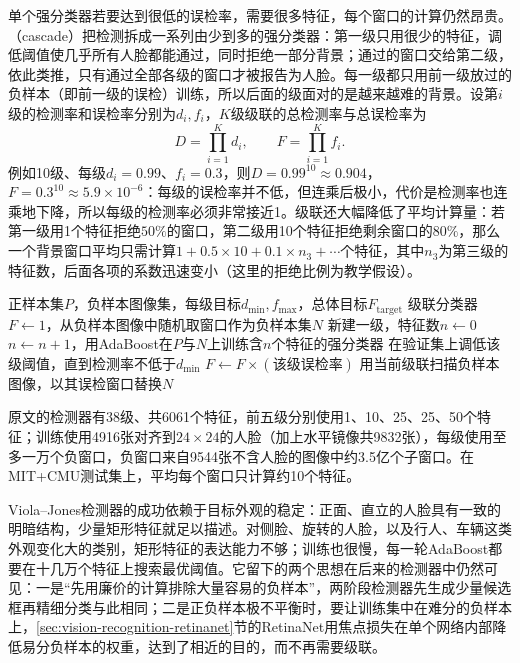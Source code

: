 单个强分类器若要达到很低的误检率，需要很多特征，每个窗口的计算仍然昂贵。（cascade）把检测拆成一系列由少到多的强分类器：第一级只用很少的特征，调低阈值使几乎所有人脸都能通过，同时拒绝一部分背景；通过的窗口交给第二级，依此类推，只有通过全部各级的窗口才被报告为人脸。每一级都只用前一级放过的负样本（即前一级的误检）训练，所以后面的级面对的是越来越难的背景。设第$i$级的检测率和误检率分别为$d_i,f_i$，$K$级级联的总检测率与总误检率为
\[
  D=\prod_{i=1}^{K}d_i,\qquad F=\prod_{i=1}^{K}f_i.
\]
例如10级、每级$d_i=0.99$、$f_i=0.3$，则$D=0.99^{10}\approx0.904$，$F=0.3^{10}\approx5.9\times10^{-6}$：每级的误检率并不低，但连乘后极小，代价是检测率也连乘地下降，所以每级的检测率必须非常接近1。级联还大幅降低了平均计算量：若第一级用1个特征拒绝$50\%$的窗口，第二级用10个特征拒绝剩余窗口的$80\%$，那么一个背景窗口平均只需计算$1+0.5\times10+0.1\times n_3+\cdots$个特征，其中$n_3$为第三级的特征数，后面各项的系数迅速变小（这里的拒绝比例为教学假设）。

\begin{algorithm}[级联检测器的训练]
  \label{alg:vision-features-cascade}
  \begin{algorithmic}[1]
    \Require 正样本集$P$，负样本图像集，每级目标$d_{\min},f_{\max}$，总体目标$F_{\mathrm{target}}$
    \Ensure 级联分类器
    \State $F\gets1$，从负样本图像中随机取窗口作为负样本集$N$
      \State 新建一级，特征数$n\gets0$
      \Repeat
        \State $n\gets n+1$，用AdaBoost在$P$与$N$上训练含$n$个特征的强分类器
        \State 在验证集上调低该级阈值，直到检测率不低于$d_{\min}$
      \State $F\gets F\times(\text{该级误检率})$
      \State 用当前级联扫描负样本图像，以其误检窗口替换$N$
    \EndWhile
  \end{algorithmic}
\end{algorithm}

原文的检测器有38级、共6061个特征，前五级分别使用1、10、25、25、50个特征；训练使用4916张对齐到$24\times24$的人脸（加上水平镜像共9832张），每级使用至多一万个负窗口，负窗口来自9544张不含人脸的图像中约3.5亿个子窗口。在MIT+CMU测试集上，平均每个窗口只计算约10个特征。

Viola–Jones检测器的成功依赖于目标外观的稳定：正面、直立的人脸具有一致的明暗结构，少量矩形特征就足以描述。对侧脸、旋转的人脸，以及行人、车辆这类外观变化大的类别，矩形特征的表达能力不够；训练也很慢，每一轮AdaBoost都要在十几万个特征上搜索最优阈值。它留下的两个思想在后来的检测器中仍然可见：一是“先用廉价的计算排除大量容易的负样本”，两阶段检测器先生成少量候选框再精细分类与此相同；二是正负样本极不平衡时，要让训练集中在难分的负样本上，\ref{sec:vision-recognition-retinanet}节的RetinaNet用焦点损失在单个网络内部降低易分负样本的权重，达到了相近的目的，而不再需要级联。

